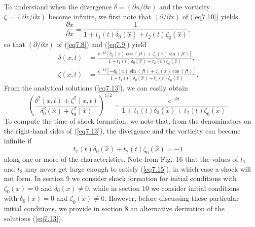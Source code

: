 \documentclass[10pt]{article}
\begin{document}
    To understand when the divergence $\delta=(\partial u/\partial x)$ and the
vorticity $\zeta=(\partial v/\partial x)$ become infinite, we first note that
$(\partial/\partial x)$ of (\ref{eq7.10}) yields
\begin{equation}                                  %
     \frac{\partial\hat{x}}{\partial x} = \frac{1}{1 + t_1(t)\delta_0(\hat{x}) + t_2(t)\zeta_0(\hat{x})},
\label{eq7.12}
\end{equation}
so that $(\partial/\partial x)$ of (\ref{eq7.8}) and (\ref{eq7.9}) yield
\begin{equation}                                  %
  \begin{split}
     \delta(x,t) &= \frac{e^{-kt}\left[ \delta_0(\hat{x})\cos(ft) + \zeta_0(\hat{x})\sin(ft)\right]}
	                 {1 + t_1(t)\delta_0(\hat{x}) + t_2(t)\zeta_0(\hat{x})},     \\
     \zeta(x,t)  &= \frac{e^{-kt}\left[-\delta_0(\hat{x})\sin(ft) + \zeta_0(\hat{x})\cos(ft)\right]}
                         {1 + t_1(t)\delta_0(\hat{x}) + t_2(t)\zeta_0(\hat{x})}.
  \end{split}
\label{eq7.13}
\end{equation}
From the analytical solutions (\ref{eq7.13}), we can easily obtain
\begin{equation}                                    %
        \left(\frac{\delta^2(x,t) + \zeta^2(x,t)}
	           {\delta_0^2(\hat{x}) + \zeta_0^2(\hat{x})}\right)^{1/2}
     = \frac{e^{-kt}}
            {1 + t_1(t)\delta_0(\hat{x}) + t_2(t)\zeta_0(\hat{x})}.
\label{eq7.14}
\end{equation}
To compute the time of shock formation, we note that, from the denominators on the
right-hand sides of (\ref{eq7.13}), the divergence and the vorticity can become
infinite if
\begin{equation}                                  %
          t_1(t)\delta_0(\hat{x}) + t_2(t)\zeta_0(\hat{x}) = -1
\label{eq7.15}
\end{equation}
along one or more of the characteristics.  Note from Fig.~16 that the values of $t_1$
and $t_2$ may never get large enough to satisfy (\ref{eq7.15}), in which case a shock
will not form. In section 9 we consider shock formation for initial conditions with
$\zeta_0(x)=0$ and $\delta_0(x)\ne 0$, while in section 10 we consider initial conditions
with $\delta_0(x)=0$ and $\zeta_0(x)\ne 0$. However, before discussing these particular
initial conditions, we provide in section 8 an alternative derivation of the solutions
(\ref{eq7.13}).
\end{document}
